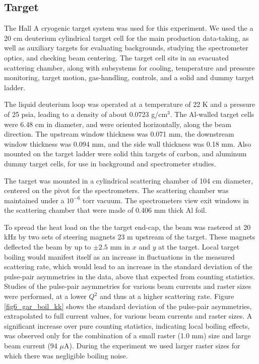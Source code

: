 \subsection{Target}\label{sec:target}

The Hall A cryogenic target system 
\cite{A-NIM} was used for this experiment. 
We used the a 20 cm deuterium cylindrical target cell 
for the main production data-taking, as well as auxiliary 
targets for evaluating backgrounds, studying the
spectrometer optics, and checking beam centering.
The target cell sits in an evacuated scattering chamber, 
along with subsystems for cooling,
temperature and pressure monitoring, target motion, gas-handling,
controls, and a solid and dummy target ladder.  

The liquid deuterium loop was operated at a temperature of 22 K and a
pressure of 25 psia, leading to a density of about 0.0723
g/cm$^3$. The Al-walled target cells were 6.48 cm in diameter, and
were oriented horizontally, along the beam direction. The upstream
window thickness was 0.071 mm, the downstream window thickness was
0.094 mm, and the side wall thickness was 0.18 mm. Also mounted on the
target ladder were solid thin targets of carbon, and aluminum dummy
target cells, for use in background and spectrometer studies.

The target was mounted in a cylindrical scattering chamber of 104 cm
diameter, centered on the pivot for the spectrometers. The scattering
chamber was maintained under a $10^{-6}$ torr vacuum. The
spectrometers view exit windows in the scattering chamber that were
made of 0.406 mm thick Al foil.

To spread the heat load on the the target end-cap,
the beam was rastered at 20 kHz by two sets of
steering magnets 23 m upstream of the target. These magnets deflected
the beam by up to $\pm 2.5$ mm in $x$ and $y$ at
the target.  
Local target boiling would manifest itself as an increase in fluctuations in the
measured scattering rate, which would lead to an increase in the
standard deviation of the pulse-pair asymmetries in the data, above
that expected from counting statistics. Studies of the pulse-pair
asymmetries for various beam currents and raster sizes were performed,
at a lower $Q^2$ and thus at a higher scattering rate. Figure
\ref{fig6_gar_boil_kk} shows the standard deviation of the 
pulse-pair asymmetries, extrapolated to full current values, for
various beam currents and raster sizes. A significant increase over
pure counting statistics, indicating local boiling effects, was
observed only for the combination of a small raster (1.0 mm) size and
large beam current (94 $\mu$A).  During the experiment we used
larger raster sizes for which there was negligible boiling noise.
